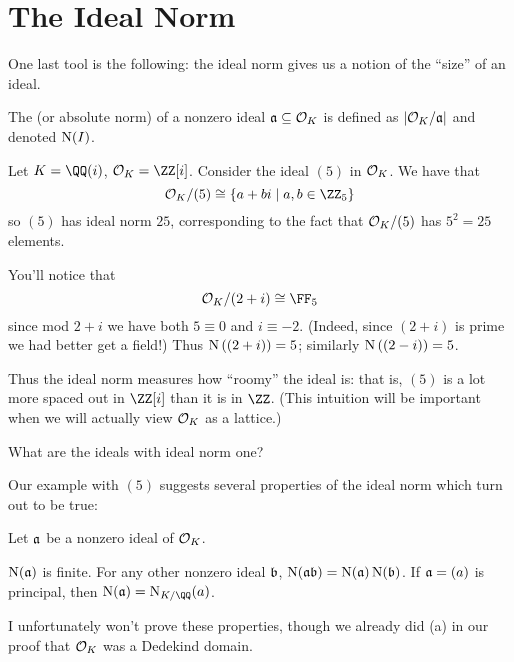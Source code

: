 \section{The Ideal Norm}
One last tool is the following:
the ideal norm gives us a notion of the ``size'' of an ideal.
\begin{definition}
	The  (or absolute norm)
	of a nonzero ideal $\aa \subseteq \OO_K$ is defined as
	$\left\lvert \OO_K / \aa \right\rvert$ and denoted $\Norm(I)$.
\end{definition}
\begin{example}
	Let $K = \QQ(i)$, $\OO_K = \ZZ[i]$.
	Consider the ideal $(5)$ in $\OO_K$.
	We have that 
	\[ \OO_K / (5) \cong \{ a+bi \mid a,b \in \ZZ_5 \} \]
	so $(5)$ has ideal norm $25$,
	corresponding to the fact that $\OO_K/(5)$ has $5^2=25$ elements.
\end{example}

\begin{example}
	You'll notice that \[ \OO_K / (2+i) \cong \FF_5 \]
	since mod $2+i$ we have both $5 \equiv 0$ and $i \equiv -2$.
	(Indeed, since $(2+i)$ is prime we had better get a field!)
	Thus $\Norm\left( (2+i) \right) = 5$; similarly $\Norm\left( (2-i) \right) = 5$.
\end{example}

Thus the ideal norm measures how ``roomy'' the ideal is:
that is, $(5)$ is a lot more spaced out in $\ZZ[i]$ than it is in $\ZZ$.
(This intuition will be important when we will actually view $\OO_K$ as a lattice.)

\begin{ques}
	What are the ideals with ideal norm one?
\end{ques}

Our example with $(5)$ suggests several properties of the ideal norm
which turn out to be true:
\begin{lemma}
	Let $\aa$ be a nonzero ideal of $\OO_K$.
	\begin{enumerate}[(a)]
		\ii $\Norm(\aa)$ is finite.
		\ii For any other nonzero ideal $\bb$, $\Norm(\aa\bb) = \Norm(\aa)\Norm(\bb)$.
		\ii If $\aa = (a)$ is principal, then $\Norm(\aa) = \Norm_{K/\QQ}(a)$.
	\end{enumerate}
\end{lemma}
I unfortunately won't prove these properties, though we already did (a) in our proof that $\OO_K$
was a Dedekind domain.

